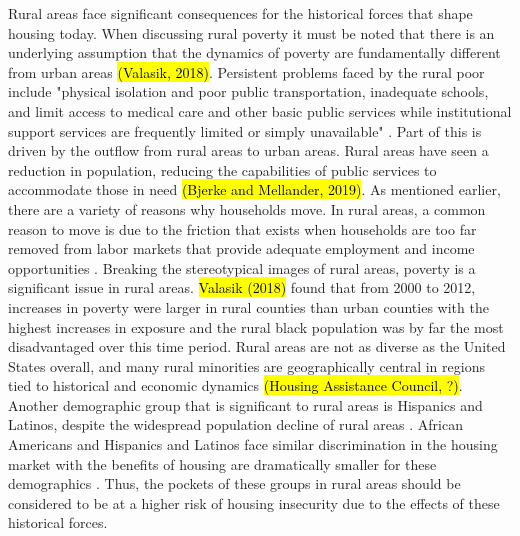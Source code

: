 Rural areas face significant consequences for the historical forces that shape housing today. When discussing rural poverty it must be noted that there is an underlying assumption that the dynamics of poverty are fundamentally different from urban areas \hl{(Valasik, 2018)}. Persistent problems faced by the rural poor include "physical isolation and poor public transportation, inadequate schools, and limit access to medical care and other basic public services while institutional support services are frequently limited or simply unavailable" \citep[?]{lichter_changing_2007}. Part of this is driven by the outflow from rural areas to urban areas. Rural areas have seen a reduction in population, reducing the capabilities of public services to accommodate those in need \hl{(Bjerke and Mellander, 2019)}. As mentioned earlier, there are a variety of reasons why households move. In rural areas, a common reason to move is due to the friction that exists when households are too far removed from labor markets that provide adequate employment and income opportunities \citep{sparks_poverty_2013}. Breaking the stereotypical images of rural areas, poverty is a significant issue in rural areas. \hl{Valasik (2018)} found that from 2000 to 2012, increases in poverty were larger in rural counties than urban counties with the highest increases in exposure and the rural black population was by far the most disadvantaged over this time period. Rural areas are not as diverse as the United States overall, and many rural minorities are geographically central in regions tied to historical and economic dynamics \hl{(Housing Assistance Council, ?)}. Another demographic group that is significant to rural areas is Hispanics and Latinos, despite the widespread population decline of rural areas \citep{lichter_demographic_2020}. African Americans and Hispanics and Latinos face similar discrimination in the housing market with the benefits of housing are dramatically smaller for these demographics \citep{krivo_housing_2004}. Thus, the pockets of these groups in rural areas should be considered to be at a higher risk of housing insecurity due to the effects of these historical forces. 

